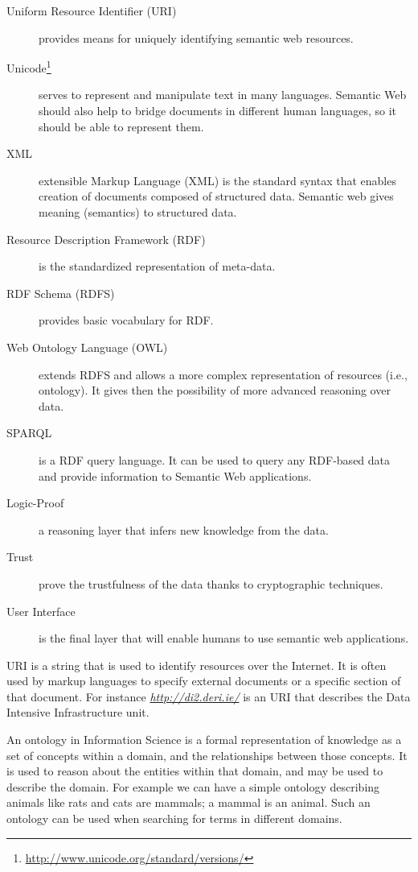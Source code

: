 \begin{description}
\item[Uniform Resource Identifier (URI)] provides means for uniquely
identifying semantic web resources.
\item[Unicode\footnote{\url{http://www.unicode.org/standard/versions/}}] 
serves to represent and manipulate text in many languages. Semantic Web should
also help to bridge documents in different human languages, so it should be
able to represent them.
\item[XML] extensible Markup Language (XML) is the standard syntax that
enables creation of documents composed of structured data. Semantic web gives
meaning (semantics) to structured data. 
\item[Resource Description Framework (RDF)] is the standardized representation
of meta-data.
\item[RDF Schema (RDFS)] provides basic vocabulary for RDF.
\item[Web Ontology Language (OWL)] extends RDFS and allows a more complex
representation of resources (i.e., ontology). It gives then the possibility of
more advanced reasoning over data.
\item[SPARQL] is a RDF query language. It can be used to query any RDF-based
data and provide information to Semantic Web applications.
\item[Logic-Proof] a reasoning layer that infers new knowledge from the data.
\item[Trust] prove the trustfulness of the data thanks to cryptographic
techniques.
\item[User Interface] is the final layer that will enable humans to use
semantic web applications.
\end{description}

URI is a string that is used to identify resources over the Internet. It is
often used by markup languages to specify external documents or a specific
section of that document. For instance \emph{\url{http://di2.deri.ie/}} is an
URI that describes the Data Intensive Infrastructure unit.

An ontology in Information Science is a formal representation of knowledge as a
set of concepts within a domain, and the relationships between those concepts.
It is used to reason about the entities within that domain, and may be used to
describe the domain. For example we can have a simple ontology describing
animals like rats and cats are mammals; a mammal is an animal. Such an ontology
can be used when searching for terms in different domains.

